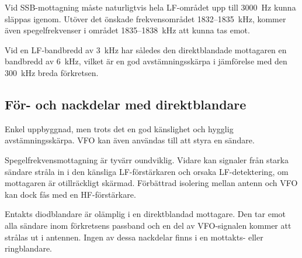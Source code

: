 Vid SSB-mottagning måste naturligtvis hela LF-området upp till 3000~Hz
kunna släppas igenom.
Utöver det önskade frekvensområdet 1832--1835~kHz, kommer även spegelfrekvenser
i området 1835--1838~kHz att kunna tas emot.

Vid en LF-bandbredd av 3~kHz har således den direktblandade mottagaren
en bandbredd av 6~kHz, vilket är en god avstämningsskärpa i jämförelse
med den 300~kHz breda förkretsen.

\subsection{För- och nackdelar med direktblandare}

Enkel uppbyggnad, men trots det en god känslighet och hygglig avstämningsskärpa.
VFO kan även användas till att styra en sändare.

Spegelfrekvensmottagning är tyvärr oundviklig.
Vidare kan signaler från starka sändare stråla in i den känsliga
LF-förstärkaren och orsaka LF-detektering, om mottagaren är otillräckligt
skärmad.
Förbättrad isolering mellan antenn och VFO kan dock fås med en HF-förstärkare.

Entakts diodblandare är olämplig i en direktblandad mottagare.
Den tar emot alla sändare inom förkretsens passband och en del av VFO-signalen
kommer att strålas ut i antennen.
Ingen av dessa nackdelar finns i en mottakts- eller ringblandare.
